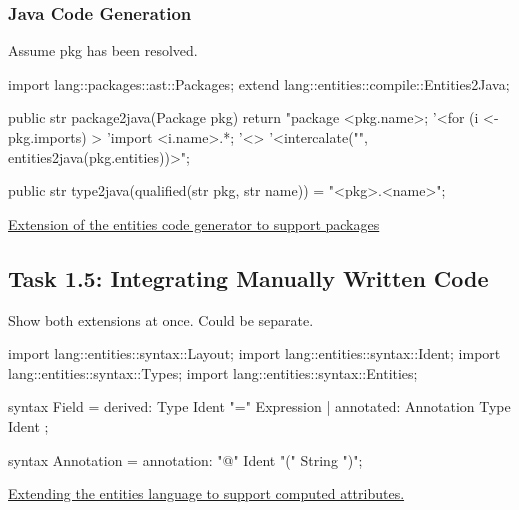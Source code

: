 \documentclass[a4paper]{article}
\def\source#1#2{\href{http://svn.rascal-mpl.org/lwc/trunk/lwc11/src/#1}{#2}}
\begin{document}
\subsubsection{Java Code Generation}

Assume pkg has been resolved.

\begin{listing}
\begin{rascal}
import lang::packages::ast::Packages;
extend lang::entities::compile::Entities2Java;

public str package2java(Package pkg) {
    return "package <pkg.name>;
           '<for (i <- pkg.imports) {>
           'import <i.name>.*;
           '<}>
           '<intercalate("\n", entities2java(pkg.entities))>";
}

public str type2java(qualified(str pkg, str name)) = "<pkg>.<name>";
\end{rascal}
\caption{\source{lang/packages/compile/Package2Java.rsc}{Extension of
    the entities code generator to support
    packages}\label{LST:package2java}}
\end{listing}



\subsection*{Task 1.5: Integrating Manually Written Code}

Show both extensions at once. Could be separate.

\begin{listing}
\begin{rascal}
import lang::entities::syntax::Layout;
import lang::entities::syntax::Ident;
import lang::entities::syntax::Types;
import lang::entities::syntax::Entities;

syntax Field 
    = derived: Type Ident "=" Expression
    | annotated: Annotation Type Ident ;
    
syntax Annotation = annotation: "@" Ident "(" String ")"; 
\end{rascal}
\caption{\source{lang/derived/syntax/Derived.rsc}{Extending the
    entities language to support computed
    attributes.}\label{LST:derived}}
\end{listing}
\end{document}
